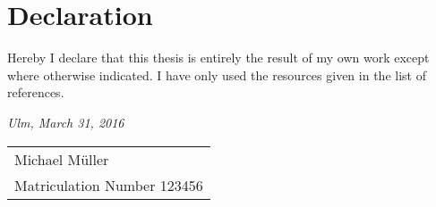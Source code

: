 \chapter*{Declaration}
\thispagestyle{empty}

Hereby I declare that this thesis is entirely the result 
of my own work except where otherwise indicated. I have only 
used the resources given in the list of references. 
\bigskip
 
\noindent\textit{Ulm, March 31, 2016}

\bigskip

\begin{flushleft}
    \begin{tabular}{m{4.6cm}}
        \\ \hline
        \centering Michael M\"uller\\
	Matriculation Number 123456
    \end{tabular}
\end{flushleft}

